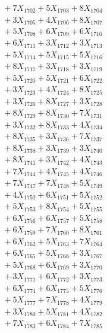 \documentclass[a4paper,10pt]{article}
\begin{document}
{\begin{align}
&\;  + 7 X_{1702} + 5 X_{1703} + 8 X_{1704} \\[0.3ex]
&\;  + 3 X_{1705} + 4 X_{1706} + 8 X_{1707} \\[0.3ex]
&\;  + 5 X_{1708} + 6 X_{1709} + 6 X_{1710} \\[0.3ex]
&\;  + 6 X_{1711} + 3 X_{1712} + 3 X_{1713} \\[0.3ex]
&\;  + 5 X_{1714} + 5 X_{1715} + 5 X_{1716} \\[0.3ex]
&\;  + 8 X_{1717} + 3 X_{1718} + 3 X_{1719} \\[0.5ex]\allowbreak
&\;  + 5 X_{1720} + 5 X_{1721} + 6 X_{1722} \\[0.3ex]
&\;  + 3 X_{1723} + 4 X_{1724} + 8 X_{1725} \\[0.3ex]
&\;  + 3 X_{1726} + 8 X_{1727} + 3 X_{1728} \\[0.3ex]
&\;  + 8 X_{1729} + 8 X_{1730} + 7 X_{1731} \\[0.3ex]
&\;  + 3 X_{1732} + 8 X_{1733} + 4 X_{1734} \\[0.3ex]
&\;  + 8 X_{1735} + 3 X_{1736} + 7 X_{1737} \\[0.3ex]
&\;  + 8 X_{1738} + 3 X_{1739} + 3 X_{1740} \\[0.3ex]
&\;  + 8 X_{1741} + 3 X_{1742} + 4 X_{1743} \\[0.3ex]
&\;  + 7 X_{1744} + 4 X_{1745} + 4 X_{1746} \\[0.3ex]
&\;  + 7 X_{1747} + 7 X_{1748} + 5 X_{1749} \\[0.5ex]\allowbreak
&\;  + 4 X_{1750} + 6 X_{1751} + 5 X_{1752} \\[0.3ex]
&\;  + 5 X_{1753} + 8 X_{1754} + 5 X_{1755} \\[0.3ex]
&\;  + 6 X_{1756} + 6 X_{1757} + 5 X_{1758} \\[0.3ex]
&\;  + 6 X_{1759} + 7 X_{1760} + 8 X_{1761} \\[0.3ex]
&\;  + 6 X_{1762} + 5 X_{1763} + 7 X_{1764} \\[0.3ex]
&\;  + 6 X_{1765} + 5 X_{1766} + 3 X_{1767} \\[0.3ex]
&\;  + 5 X_{1768} + 6 X_{1769} + 3 X_{1770} \\[0.3ex]
&\;  + 3 X_{1771} + 6 X_{1772} + 3 X_{1773} \\[0.3ex]
&\;  + 6 X_{1774} + 6 X_{1775} + 5 X_{1776} \\[0.3ex]
&\;  + 5 X_{1777} + 7 X_{1778} + 4 X_{1779} \\[0.5ex]\allowbreak
&\;  + 3 X_{1780} + 5 X_{1781} + 4 X_{1782} \\[0.3ex]
&\;  + 7 X_{1783} + 6 X_{1784} + 7 X_{1785} \\[0.3ex]

\end{align}}
\end{document}
